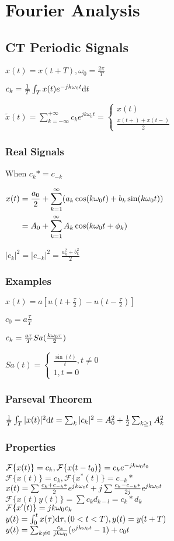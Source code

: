 \section{Fourier Analysis}
\subsection*{CT Periodic Signals}
$x(t)=x(t+T), \omega_0=\frac{2\pi}{T}$

$c_k=\frac 1 T \int_T x(t) e^{-jk\omega_0 t} \mathrm{d} t$

$\tilde{x}(t)=\sum_{k=-\infty}^{+\infty} c_k e^{jk\omega_0 t}=\begin{cases}x(t)\\ \frac{x(t+)+x(t-)}2\end{cases}$
\subsubsection*{Real Signals}
When $c_k*=c_{-k}$

\hfill $\begin{aligned}
x(t)&=\frac{a_0}{2} + \sum_{k=1}^{\infty} (a_k \cos(k\omega_0t)+b_k\sin(k \omega_0 t)) \\
&=A_0+\sum_{k=1}^{\infty} A_k\cos(k\omega_0 t+\phi_k)
\end{aligned}$

$|c_k|^2=|c_{-k}|^2=\frac{a_k^2+b_k^2}{2}$

\subsubsection*{Examples}
$x(t)=a[u(t+\frac\tau 2) - u(t-\frac\tau 2)]$

$c_0=a\frac\tau T$

$c_k=\frac{a\tau}{T} Sa(\frac{k\omega_0\tau}{2})$

$Sa(t)=\begin{cases}\frac{\sin(t)}{t}, t\ne 0\\1, t=0\end{cases}$

\subsubsection*{Parseval Theorem}

$\frac  1 T \int_T |x(t)|^2\mathrm{d} t = \sum_k |c_k|^2=A_0^2+\frac 1 2\sum_{k\ge 1} A_k^2$

\subsubsection*{Properties}
$\mathcal{F}\{x(t)\}=c_k,\mathcal{F}\{x(t-t_0)\}=c_ke^{-jk\omega_0 t_0}$\\
$\mathcal{F}\{x(t)\}=c_k,\mathcal{F}\{x^*(t)\}=c_{-k}*$\\
$x(t)= \sum \frac{c_k+c_{-k}*}{2}e^{jk\omega_0t} + j \sum \frac{c_k-c_{-k}*}{2j}e^{jk\omega_0t}$ \\
$\mathcal{F}\{x(t)y(t)\}=\sum c_kd_{k-l}=c_k*d_k$\\
$\mathcal{F}\{x'(t)\}=jk\omega_0c_k$\\
$y(t)=\int_0^{t}x(\tau)\mathrm{d} \tau, (0<t<T), y(t)=y(t+T)$\\$y(t)=\sum_{k\ne 0} \frac{c_k}{jk\omega_0}(e^{jk\omega_0 t} - 1) + c_0t$

